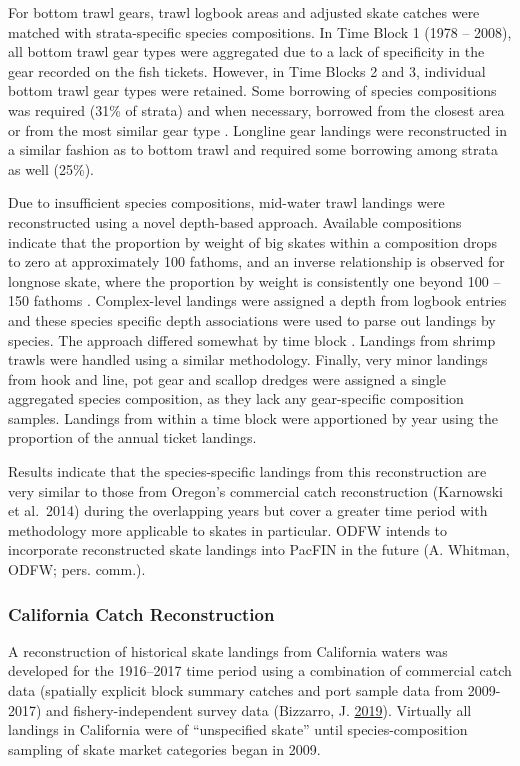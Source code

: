 \documentclass[12pt,]{article}
\begin{document}
For bottom trawl gears, trawl logbook areas and adjusted skate catches
were matched with strata-specific species compositions. In Time Block 1
(1978 -- 2008), all bottom trawl gear types were aggregated due to a
lack of specificity in the gear recorded on the fish tickets. However,
in Time Blocks 2 and 3, individual bottom trawl gear types were
retained. Some borrowing of species compositions was required (31\% of
strata) and when necessary, borrowed from the closest area or from the
most similar gear type . Longline gear landings were reconstructed in a
similar fashion as to bottom trawl and required some borrowing among
strata as well (25\%).

Due to insufficient species compositions, mid-water trawl landings were
reconstructed using a novel depth-based approach. Available compositions
indicate that the proportion by weight of big skates within a
composition drops to zero at approximately 100 fathoms, and an inverse
relationship is observed for longnose skate, where the proportion by
weight is consistently one beyond 100 -- 150 fathoms . Complex-level
landings were assigned a depth from logbook entries and these species
specific depth associations were used to parse out landings by species.
The approach differed somewhat by time block . Landings from shrimp
trawls were handled using a similar methodology. Finally, very minor
landings from hook and line, pot gear and scallop dredges were assigned
a single aggregated species composition, as they lack any gear-specific
composition samples. Landings from within a time block were apportioned
by year using the proportion of the annual ticket landings.

Results indicate that the species-specific landings from this
reconstruction are very similar to those from Oregon's commercial catch
reconstruction (Karnowski et al.~2014) during the overlapping years but
cover a greater time period with methodology more applicable to skates
in particular. ODFW intends to incorporate reconstructed skate landings
into PacFIN in the future (A. Whitman, ODFW; pers. comm.).

\hypertarget{california-catch-reconstruction}{%
\subsubsection{California Catch
Reconstruction}\label{california-catch-reconstruction}}

A reconstruction of historical skate landings from California waters was
developed for the 1916--2017 time period using a combination of
commercial catch data (spatially explicit block summary catches and port
sample data from 2009-2017) and fishery-independent survey data
(Bizzarro, J. \protect\hyperlink{ref-Bizzarro2019}{2019}). Virtually all
landings in California were of ``unspecified skate'' until
species-composition sampling of skate market categories began in 2009.
\end{document}
